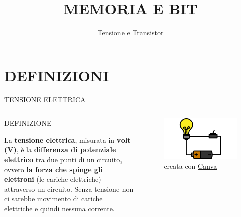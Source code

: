 \documentclass[aspectratio=1610]{beamer}
\title{MEMORIA E BIT}
\subtitle{Tensione e Transistor}
\date{}
\institute{\textit{
        Fonti:
        \begin{itemize}
            \item[-] \href{https://www.geopop.it/qual-e-la-differenza-tra-corrente-e-tensione/}{Geopop}
            \item[-] \href{https://www.fastweb.it/fastweb-plus/digital-magazine/com-e-fatto-e-come-funziona-un-transistor/}{Fastweb Plus}
        \end{itemize}
    }
}
\begin{document}
\begin{frame}
    \titlepage
\end{frame}

\section{DEFINIZIONI}

\begin{frame}{TENSIONE ELETTRICA}
    \begin{columns}
           \begin{alertblock}{DEFINIZIONE}
                \begin{minipage}{0.96\linewidth}
                    \justifying
                    La \textbf{tensione elettrica}, misurata in \textbf{volt (V)}, è la \textbf{differenza di 
                    potenziale elettrico} tra due punti di un circuito, ovvero \textbf{la forza che 
                    spinge gli elettroni} (le cariche elettriche) attraverso un circuito. 
                    Senza tensione non ci sarebbe movimento di cariche elettriche e quindi 
                    nessuna corrente.
                \end{minipage}
           \end{alertblock}
            \begin{figure}
                \includegraphics[width=\linewidth]{img/tensione.png}
                \caption{{creata con \href{www.canva.com}{Canva}}}
            \end{figure}
    \end{columns}
\end{frame}
\end{document}
